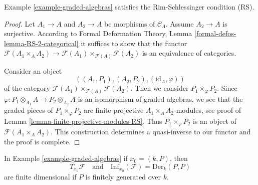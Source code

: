 \begin{lemma}
\label{lemma-graded-algebras-RS}
Example \ref{example-graded-algebras}
satisfies the Rim-Schlessinger condition (RS).
\end{lemma}

\begin{proof}
Let $A_1 \to A$ and $A_2 \to A$ be morphisms of $\mathcal{C}_\Lambda$.
Assume $A_2 \to A$ is surjective. According to
Formal Deformation Theory, Lemma
\ref{formal-defos-lemma-RS-2-categorical}
it suffices to show that the functor
$\mathcal{F}(A_1 \times_A A_2) \to
\mathcal{F}(A_1) \times_{\mathcal{F}(A)} \mathcal{F}(A_2)$
is an equivalence of categories.

\medskip\noindent
Consider an object
$$
((A_1, P_1), (A_2, P_2), (\text{id}_A, \varphi))
$$
of the category $\mathcal{F}(A_1) \times_{\mathcal{F}(A)} \mathcal{F}(A_2)$.
Then we consider $P_1 \times_\varphi P_2$. Since
$\varphi : P_1 \otimes_{A_1} A \to P_2 \otimes_{A_2} A$
is an isomorphism of graded algebras, we see that the graded pieces
of $P_1 \times_\varphi P_2$ are finite projective $A_1 \times_A A_2$-modules,
see proof of Lemma \ref{lemma-finite-projective-modules-RS}.
Thus $P_1 \times_\varphi P_2$ is an object of $\mathcal{F}(A_1 \times_A A_2)$.
This construction determines a quasi-inverse to our functor
and the proof is complete.
\end{proof}

\begin{lemma}
\label{lemma-graded-algebras-TI}
In Example \ref{example-graded-algebras}
if $x_0 = (k, P)$, then
$$
T_{x_0}\mathcal{F}
\quad\text{and}\quad
\text{Inf}_{x_0}(\mathcal{F}) = \text{Der}_k(P, P)
$$
are finite dimensional if $P$ is finitely generated over $k$.
\end{lemma}


